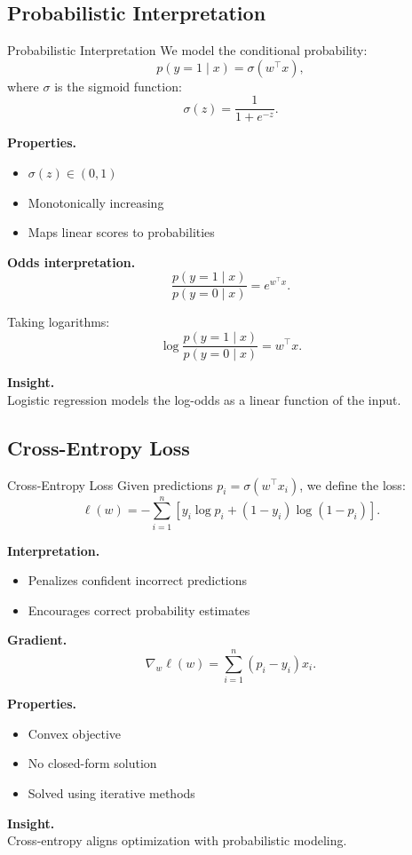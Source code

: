 \documentclass[aspectratio=169,11pt]{beamer}
\begin{document}
\subsection{Probabilistic Interpretation}
\begin{frame}[t,allowframebreaks]{Probabilistic Interpretation}
\small
We model the conditional probability:
\[
p(y = 1 \mid x) = \sigma(w^\top x),
\]
where $\sigma$ is the sigmoid function:
\[
\sigma(z) = \frac{1}{1 + e^{-z}}.
\]

\textbf{Properties.}\\ \begin{itemize}
    \item $\sigma(z) \in (0,1)$
    \item Monotonically increasing
    \item Maps linear scores to probabilities
\end{itemize}

\textbf{Odds interpretation.}\\ \[
\frac{p(y=1 \mid x)}{p(y=0 \mid x)} = e^{w^\top x}.
\]

Taking logarithms:
\[
\log \frac{p(y=1 \mid x)}{p(y=0 \mid x)} = w^\top x.
\]

\textbf{Insight.}\\ Logistic regression models the log-odds as a linear function of the input.
\end{frame}

\subsection{Cross-Entropy Loss}
\begin{frame}[t,allowframebreaks]{Cross-Entropy Loss}
\small
Given predictions $p_i = \sigma(w^\top x_i)$, we define the loss:
\[
\ell(w) = - \sum_{i=1}^n \left[
y_i \log p_i + (1 - y_i)\log(1 - p_i)
\right].
\]

\textbf{Interpretation.}\\ \begin{itemize}
    \item Penalizes confident incorrect predictions
    \item Encourages correct probability estimates
\end{itemize}

\textbf{Gradient.}\\ \[
\nabla_w \ell(w) = \sum_{i=1}^n (p_i - y_i)x_i.
\]

\textbf{Properties.}\\ \begin{itemize}
    \item Convex objective
    \item No closed-form solution
    \item Solved using iterative methods
\end{itemize}

\textbf{Insight.}\\ Cross-entropy aligns optimization with probabilistic modeling.
\end{frame}
\end{document}
